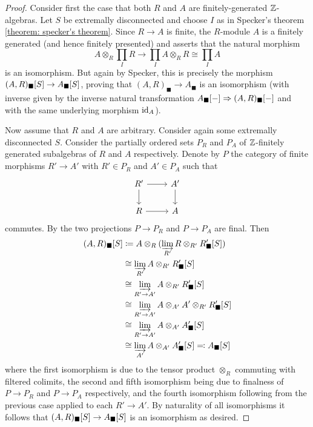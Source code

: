 \begin{proof}
	Consider first the case that both $R$ and $A$ are finitely-generated ${\mathbb{Z}}$-algebras. Let $S$ be extremally disconnected and choose $I$ as in Specker's theorem \ref{theorem: specker's theorem}. Since $R\to A$ is finite, the $R$-module $A$ is a finitely generated (and hence finitely presented) and \cite[\href{https://stacks.math.columbia.edu/tag/059K}{Tag 059K}]{stacks-project} asserts that the natural morphism
		$$A\otimes_R \prod_I R \to \prod_I A\otimes_R R \cong \prod_I A$$
	is an isomorphism. But again by Specker, this is precisely the morphism ${(A, R)_\blacksquare[S]} \to {A_\blacksquare[S]}$, proving that $(A, R)_\blacksquare \to A_\blacksquare$ is an isomorphism (with inverse given by the inverse natural transformation ${A_\blacksquare[-]}\Rightarrow {(A, R)_\blacksquare[-]}$ and with the same underlying morphism $\mathrm{id}_A$).
	
	Now assume that $R$ and $A$ are arbitrary. Consider again some extremally disconnected $S$. Consider the partially ordered sets $P_R$ and $P_A$ of ${\mathbb{Z}}$-finitely generated subalgebras of $R$ and $A$ respectively. Denote by $P$ the category of finite morphisms $R'\to A'$ with $R' \in P_R$ and $A' \in P_A$ such that
	$$\begin{tikzcd}
		R' \ar[r]\ar[d] &A'\ar[d]\\
		R \ar[r] & A
	\end{tikzcd}$$
	commutes. By \cite[\href{https://stacks.math.columbia.edu/tag/0BTG}{Tag 0BTG}]{stacks-project} the two projections $P\to P_R$ and $P\to P_A$ are final. Then
	\begin{align*}
		{(A, R)_\blacksquare[S]}
		&\coloneqq A\otimes_R (\varinjlim_{R'} R\otimes_{R'} {R'_\blacksquare[S]})\\
		&\cong \varinjlim_{R'} A\otimes_{R'} {R'_\blacksquare[S]}\\
		&\cong \varinjlim_{R'\to A'}A\otimes_{R'} {R'_\blacksquare[S]}\\
		&\cong \varinjlim_{R'\to A'}A\otimes_{A'} A' \otimes_{R'} {R'_\blacksquare[S]}\\
		&\cong \varinjlim_{R'\to A'} A\otimes_{A'} {A'_\blacksquare[S]}\\
		&\cong \varinjlim_{A'} A\otimes_{A'} {A'_\blacksquare[S]} \eqqcolon {A_\blacksquare[S]}
	\end{align*}
	where the first isomorphism is due to the tensor product $\otimes_R$ commuting with filtered colimits, the second and fifth isomorphism being due to finalness of $P\to P_R$ and $P\to P_A$ respectively, and the fourth isomorphism following from the previous case applied to each $R'\to A'$. By naturality of all isomorphisms it follows that ${(A, R)_\blacksquare[S]}\to{A_\blacksquare[S]}$ is an isomorphism as desired.
\end{proof}

